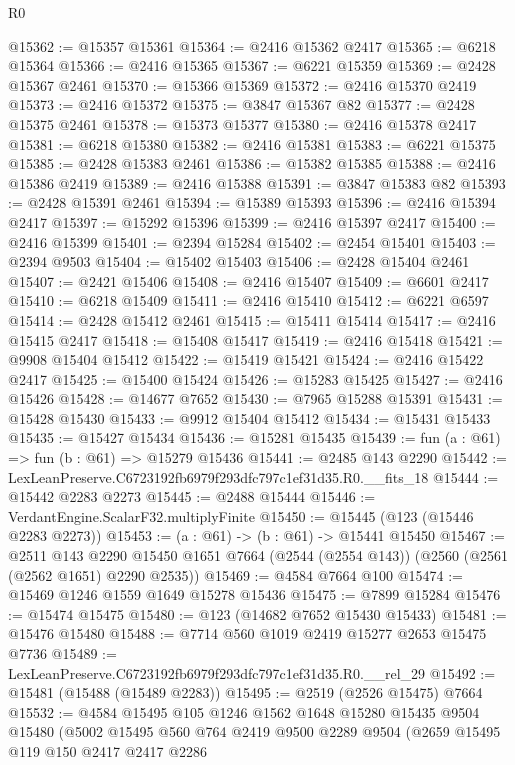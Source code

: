 \begin{lexlean}{R0}
\begin{coremodule}
@15362 := @15357 @15361
@15364 := @2416 @15362 @2417
@15365 := @6218 @15364
@15366 := @2416 @15365
@15367 := @6221 @15359
@15369 := @2428 @15367 @2461
@15370 := @15366 @15369
@15372 := @2416 @15370 @2419
@15373 := @2416 @15372
@15375 := @3847 @15367 @82
@15377 := @2428 @15375 @2461
@15378 := @15373 @15377
@15380 := @2416 @15378 @2417
@15381 := @6218 @15380
@15382 := @2416 @15381
@15383 := @6221 @15375
@15385 := @2428 @15383 @2461
@15386 := @15382 @15385
@15388 := @2416 @15386 @2419
@15389 := @2416 @15388
@15391 := @3847 @15383 @82
@15393 := @2428 @15391 @2461
@15394 := @15389 @15393
@15396 := @2416 @15394 @2417
@15397 := @15292 @15396
@15399 := @2416 @15397 @2417
@15400 := @2416 @15399
@15401 := @2394 @15284
@15402 := @2454 @15401
@15403 := @2394 @9503
@15404 := @15402 @15403
@15406 := @2428 @15404 @2461
@15407 := @2421 @15406
@15408 := @2416 @15407
@15409 := @6601 @2417
@15410 := @6218 @15409
@15411 := @2416 @15410
@15412 := @6221 @6597
@15414 := @2428 @15412 @2461
@15415 := @15411 @15414
@15417 := @2416 @15415 @2417
@15418 := @15408 @15417
@15419 := @2416 @15418
@15421 := @9908 @15404 @15412
@15422 := @15419 @15421
@15424 := @2416 @15422 @2417
@15425 := @15400 @15424
@15426 := @15283 @15425
@15427 := @2416 @15426
@15428 := @14677 @7652
@15430 := @7965 @15288 @15391
@15431 := @15428 @15430
@15433 := @9912 @15404 @15412
@15434 := @15431 @15433
@15435 := @15427 @15434
@15436 := @15281 @15435
@15439 := fun (a : @61) => fun (b : @61) => @15279 @15436
@15441 := @2485 @143 @2290
@15442 := LexLeanPreserve.C6723192fb6979f293dfc797c1ef31d35.R0.__fits_18
@15444 := @15442 @2283 @2273
@15445 := @2488 @15444
@15446 := VerdantEngine.ScalarF32.multiplyFinite
@15450 := @15445 (@123 (@15446 @2283 @2273))
@15453 := (a : @61) -> (b : @61) -> @15441 @15450
@15467 := @2511
    @143
    @2290
    @15450
    @1651
    @7664
    (@2544 (@2554 @143))
    (@2560 (@2561 (@2562 @1651) @2290 @2535))
@15469 := @4584 @7664 @100
@15474 := @15469 @1246 @1559 @1649 @15278 @15436
@15475 := @7899 @15284
@15476 := @15474 @15475
@15480 := @123 (@14682 @7652 @15430 @15433)
@15481 := @15476 @15480
@15488 := @7714 @560 @1019 @2419 @15277 @2653 @15475 @7736
@15489 := LexLeanPreserve.C6723192fb6979f293dfc797c1ef31d35.R0.__rel_29
@15492 := @15481 (@15488 (@15489 @2283))
@15495 := @2519 (@2526 @15475) @7664
@15532 := @4584
    @15495
    @105
    @1246
    @1562
    @1648
    @15280
    @15435
    @9504
    @15480
    (@5002
      @15495
      @560
      @764
      @2419
      @9500
      @2289
      @9504
      (@2659
        @15495
        @119
        @150
        @2417
        @2417
        @2286

\end{coremodule}
\end{lexlean}
